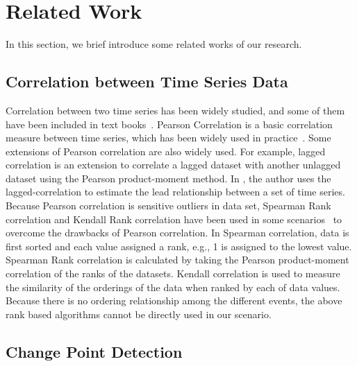 \section{Related Work}
\label{sec:relatedwork}
In this section, we brief introduce some related works of our research.

\subsection{Correlation between Time Series Data}
Correlation between two time series has been widely studied, and some of them have been included in text books~\cite{johnson2002applied}. Pearson Correlation \cite{nagelkerke1991note} is a basic correlation measure between time series, which has been widely used in practice~\cite{Zhu:VLDB:2002}. Some extensions of Pearson correlation are also widely used. For example, lagged correlation is an extension to correlate a lagged dataset with another unlagged dataset using the Pearson product-moment method. In \cite{wu2010detecting}, the author uses the lagged-correlation to estimate the lead relationship between a set of time series. Because Pearson correlation is sensitive outliers in data set, Spearman Rank correlation and Kendall Rank correlation have been used in some scenarios~\cite{Lehman:SAS:2005} to overcome the drawbacks of Pearson correlation. In Spearman correlation, data is first sorted and each value assigned a rank, e.g., 1 is assigned to the lowest value. Spearman Rank correlation is calculated by taking the Pearson product-moment correlation of the ranks of the datasets. Kendall correlation is used to measure the similarity of the orderings of the data when ranked by each of data values. Because there is no ordering relationship among the different events, the above rank based algorithms cannot be directly used in our scenario.

\subsection{Change Point Detection}

